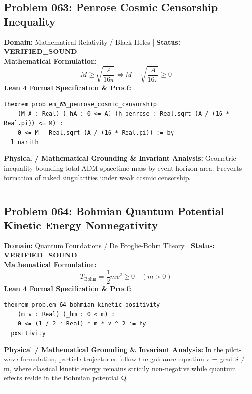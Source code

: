 \documentclass[10pt,a4paper]{article}
\begin{document}
\subsection*{Problem 063: Penrose Cosmic Censorship Inequality}
\textbf{Domain:} Mathematical Relativity / Black Holes \quad | \quad \textbf{Status:} \textcolor{green!70!black}{\textbf{VERIFIED\_SOUND}}\\
\textbf{Mathematical Formulation:}
\begin{equation*}
  M \ge \sqrt{\frac{A}{16\pi}} \iff M - \sqrt{\frac{A}{16\pi}} \ge 0
\end{equation*}
\textbf{Lean 4 Formal Specification \& Proof:}
\begin{lstlisting}
theorem problem_63_penrose_cosmic_censorship
    (M A : Real) (_hA : 0 <= A) (h_penrose : Real.sqrt (A / (16 * Real.pi)) <= M) :
    0 <= M - Real.sqrt (A / (16 * Real.pi)) := by
  linarith
\end{lstlisting}
\textbf{Physical / Mathematical Grounding \& Invariant Analysis:}
Geometric inequality bounding total ADM spacetime mass by event horizon area. Prevents formation of naked singularities under weak cosmic censorship.
\vspace{0.8em}\hrule\vspace{0.8em}
\subsection*{Problem 064: Bohmian Quantum Potential Kinetic Energy Nonnegativity}
\textbf{Domain:} Quantum Foundations / De Broglie-Bohm Theory \quad | \quad \textbf{Status:} \textcolor{green!70!black}{\textbf{VERIFIED\_SOUND}}\\
\textbf{Mathematical Formulation:}
\begin{equation*}
  T_{\text{Bohm}} = \frac{1}{2} m v^2 \ge 0 \quad (m > 0)
\end{equation*}
\textbf{Lean 4 Formal Specification \& Proof:}
\begin{lstlisting}
theorem problem_64_bohmian_kinetic_positivity
    (m v : Real) (_hm : 0 < m) :
    0 <= (1 / 2 : Real) * m * v ^ 2 := by
  positivity
\end{lstlisting}
\textbf{Physical / Mathematical Grounding \& Invariant Analysis:}
In the pilot-wave formulation, particle trajectories follow the guidance equation v = grad S / m, where classical kinetic energy remains strictly non-negative while quantum effects reside in the Bohmian potential Q.
\vspace{0.8em}\hrule\vspace{0.8em}
\end{document}
